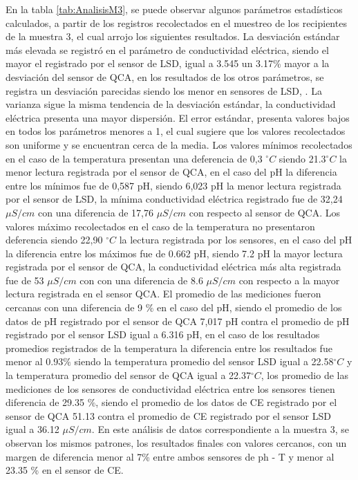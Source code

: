 En la tabla \ref{tab:AnalisisM3}, se puede observar algunos par\'ametros estad\'isticos calculados, a partir de los registros recolectados en el muestreo de los recipientes de la muestra 3, el cual arrojo los siguientes resultados. 
La desviaci\'on est\'andar m\'as elevada se registr\'o en el par\'ametro de conductividad el\'ectrica, siendo el mayor el registrado por el sensor de LSD, igual a 3.545 un  3.17\%  mayor a la desviación del sensor de QCA, en los resultados de  los otros par\'ametros, se registra un desviaci\'on parecidas siendo los menor en sensores de LSD,   . 
La varianza sigue la misma tendencia de la desviaci\'on est\'andar, la conductividad el\'ectrica presenta una mayor dispersi\'on. 
El error est\'andar, presenta valores bajos en todos los par\'ametros menores a 1, el cual sugiere que los valores recolectados son uniforme y se encuentran cerca de la media. 
Los valores mínimos recolectados en el caso de la temperatura presentan una deferencia de 0,3 $ ^{\circ}C$ siendo 21.3$ ^{\circ}C$ la menor lectura registrada por el sensor de QCA, en el caso del pH la diferencia entre los mínimos fue de 0,587 pH, siendo 6,023 pH la menor lectura registrada por el sensor de LSD, la m\'inima conductividad el\'ectrica registrado fue de 32,24 $\mu S/cm$ con una diferencia de 17,76 $\mu S/cm$ con respecto al sensor de QCA. 
Los valores m\'aximo recolectados en el caso de la temperatura no presentaron  deferencia siendo 22,90 $ ^{\circ}C$ la  lectura registrada por los sensores, en el caso del pH la diferencia entre los m\'aximos fue de 0.662 pH, siendo 7.2 pH la mayor lectura registrada por el sensor de QCA, la conductividad el\'ectrica m\'as alta registrada fue de 53 $\mu S/cm$ con con una diferencia de 8.6 $\mu S/cm$ con respecto a la mayor lectura registrada en el sensor QCA.
El promedio de las mediciones fueron cercanas con una diferencia de 9 $\%$ en el caso del pH, siendo el promedio de los datos de pH registrado por el sensor de QCA 7,017 pH contra el promedio de pH registrado por el sensor LSD igual a 6.316 pH, en el caso de los resultados promedios registrados de la temperatura la diferencia entre los resultados fue menor al 0.93$\%$ siendo la temperatura promedio del sensor LSD igual a 22.58$ ^{\circ}C$ y la temperatura promedio del sensor de QCA igual a 22.37$^{\circ}C$, los promedio de las mediciones de los sensores de conductividad eléctrica entre los sensores tienen diferencia de 29.35 $\%$, siendo el promedio de los datos de CE registrado por el sensor de QCA 51.13 contra el promedio de CE registrado por el sensor LSD igual a 36.12 $\mu S/cm$.
En este an\'alisis de datos correspondiente a la muestra 3, se observan los mismos patrones, los resultados finales con valores cercanos, con un margen de diferencia menor al 7\% entre ambos sensores de ph - T y menor al 23.35 \% en el sensor de CE.

